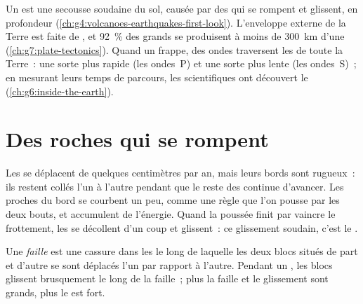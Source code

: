 \begin{recall}
Un \emph{} est une secousse soudaine du sol, causée par des 
qui se rompent et glissent, en profondeur
(\cref{ch:g4:volcanoes-earthquakes-first-look}). L'enveloppe externe de la
Terre est faite de , et 92~\% des grands  se produisent à
moins de \qty{300}{km} d'une 
(\cref{ch:g7:plate-tectonics}). Quand un  frappe, des ondes
traversent les  de toute la Terre~: une sorte plus rapide (les
ondes~P) et une sorte plus lente (les ondes~S)~; en mesurant leurs temps
de parcours, les scientifiques ont découvert le 
(\cref{ch:g6:inside-the-earth}).
\end{recall}

\section{Des roches qui se rompent}

Les  se déplacent de quelques centimètres par an, mais leurs bords
sont rugueux~: ils restent collés l'un à l'autre pendant que le reste des
 continue d'avancer. Les  proches du bord se courbent un peu,
comme une règle que l'on pousse par les deux bouts, et accumulent de
l'énergie. Quand la poussée finit par vaincre le frottement, les  se
décollent d'un coup et glissent~: ce glissement soudain, c'est le .

\begin{definition}[Faille]\label{def:g7:earthquakes:fault}
Une \emph{faille} est une cassure dans les  le long de
laquelle les deux blocs situés de part et d'autre se sont déplacés l'un par
rapport à l'autre. Pendant un , les blocs glissent brusquement le long
de la faille~; plus la faille et le glissement sont grands, plus le 
est fort.
\end{definition}

